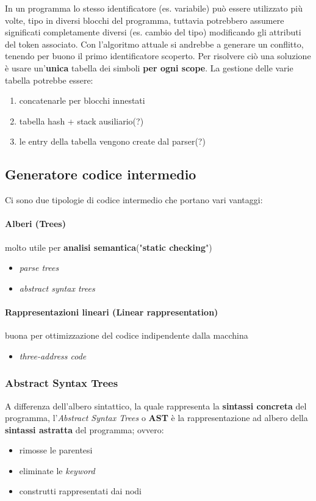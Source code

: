 In un programma lo stesso identificatore (es. variabile) può essere utilizzato
più volte, tipo in diversi blocchi del programma, tuttavia potrebbero assumere
significati completamente diversi (es. cambio del tipo) modificando gli
attributi del token associato. Con l'algoritmo attuale si andrebbe a generare
un conflitto, tenendo per buono il primo identificatore scoperto. Per risolvere
ciò una soluzione è usare un'\textbf{unica} tabella dei simboli
\textbf{per ogni scope}. La gestione delle varie tabella potrebbe essere:
\begin{enumerate}
\item concatenarle per blocchi innestati
\item tabella hash + stack ausiliario(?)\label{soltwo}
\item le entry della tabella vengono create dal parser(?)\label{solthree}
\end{enumerate}

\subsection{Generatore codice intermedio}
\label{sec:generatore_codice_intermedio}
Ci sono due tipologie di codice intermedio che portano vari vantaggi:
\paragraph{Alberi (Trees)}
molto utile per \textbf{analisi semantica}("\textbf{static checking}")
\begin{itemize}
\item \textit{parse trees}
\item \textit{abstract syntax trees}
\end{itemize}

\paragraph{Rappresentazioni lineari (Linear rappresentation)}
buona per ottimizzazione del codice indipendente dalla macchina
\begin{itemize}
\item \textit{three-address code}
\end{itemize}

\subsubsection{Abstract Syntax Trees}
\label{sec:ast}
A differenza dell'albero sintattico, la quale rappresenta la
\textbf{sintassi concreta} del programma, l'\textit{Abstract Syntax Trees} o
\textbf{AST} è la rappresentazione ad albero della \textbf{sintassi astratta}
del programma; ovvero:
\begin{itemize}
\item rimosse le parentesi
\item eliminate le \textit{keyword}
\item construtti rappresentati dai nodi
\end{itemize}

